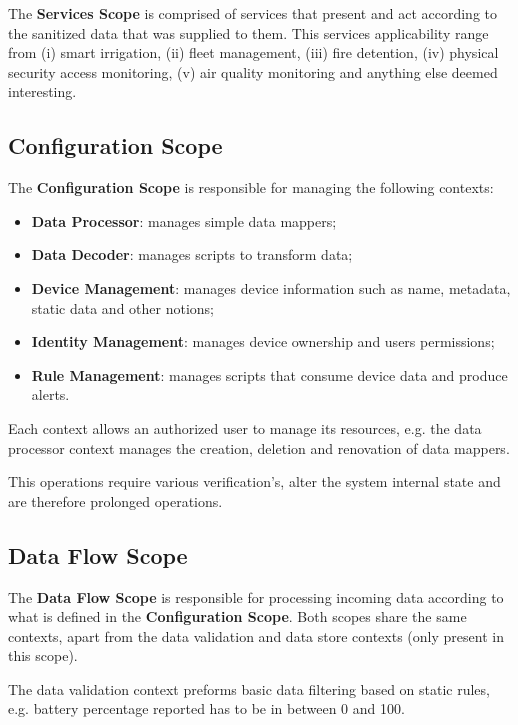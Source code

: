 The \textbf{Services Scope} is comprised of services that present and act according to the sanitized data that was supplied to them. This services applicability range from (i) smart irrigation, (ii) fleet management, (iii) fire detention, (iv) physical security access monitoring, (v) air quality monitoring and anything else deemed interesting.

\subsection{Configuration Scope}
\label{subsec:design:system_scopes:configuration_scope}

The \textbf{Configuration Scope} is responsible for managing the following contexts:

\begin{itemize}
   \item \textbf{Data Processor}: manages simple data mappers;
   \item \textbf{Data Decoder}: manages scripts to transform data;
   \item \textbf{Device Management}: manages device information such as name, metadata, static data and other notions;
   \item \textbf{Identity Management}: manages device ownership and users permissions;
   \item \textbf{Rule Management}: manages scripts that consume device data and produce alerts.
\end{itemize}

Each context allows an authorized user to manage its resources, e.g. the data processor context manages the creation, deletion and renovation of data mappers.

This operations require various verification's, alter the system internal state and are therefore prolonged operations.

\subsection{Data Flow Scope}
\label{subsec:design:system_scopes:data_flow_scope}

The \textbf{Data Flow Scope} is responsible for processing incoming data according to what is defined in the \textbf{Configuration Scope}. Both scopes share the same contexts, apart from the data validation and data store contexts (only present in this scope).

The data validation context preforms basic data filtering based on static rules, e.g. battery percentage reported has to be in between 0 and 100.

